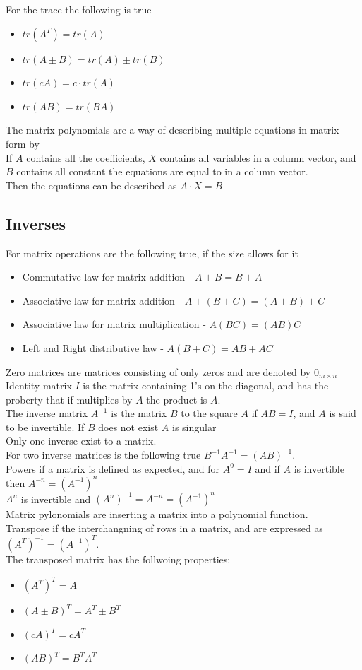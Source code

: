 \documentclass[12pt, a4paper]{article}
\begin{document}
				For the trace the following is true
				\begin{itemize}
					\item $tr(A^T)=tr(A)$
					\item $tr(A\pm B)=tr(A)\pm tr(B)$
					\item $tr(cA)=c\cdot tr(A)$
					\item $tr(AB)=tr(BA)$
				\end{itemize}
				The matrix polynomials are a way of describing multiple equations in matrix form by\\
				If $A$ contains all the coefficients, $X$ contains all variables in a column vector, and $B$ contains all constant the equations are equal to in a column vector.\\
				Then the equations can be described as  $A\cdot X=B$
		\subsection{Inverses}
			For matrix operations are the following true, if the size allows for it
			\begin{itemize}
				\item Commutative law for matrix addition - $A + B = B + A$
				\item Associative law for matrix addition - $A + ( B + C) = (A+B)+C$
				\item Associative law for matrix multiplication - $A(BC)=(AB)C$\\
				\item Left and Right distributive law - $A(B+C)=AB+AC$
			\end{itemize}
			Zero matrices are matrices consisting of only zeros and are denoted by $0_{m\times n}$\\
			Identity matrix $I$ is the matrix containing 1's on the diagonal, and has the proberty that if multiplies by $A$ the product is $A$.\\
			The inverse matrix $A^{-1}$ is the matrix $B$ to the square $A$ if $AB=I$, and $A$ is said to be invertible. If $B$ does not exist $A$ is singular\\
			Only one inverse exist to a matrix.\\
			For two inverse matrices is the following true $B^{-1}A^{-1}=(AB)^{-1}$.\\
			Powers if a matrix is defined as expected, and for $A^0=I$ and if $A$ is invertible then $A^{-n}=(A^{-1})^n$\\
			$A^n$ is invertible and $(A^n)^{-1}=A^{-n}=(A^{-1})^n$\\
			Matrix pylonomials are inserting a matrix into a polynomial function.\\
			Transpose if the interchangning of rows in a matrix, and are expressed as $(A^T)^{-1}=(A^{-1})^T$.\\
			The transposed matrix has the follwoing properties:
			\begin{itemize}
				\item $(A^T)^T=A$
				\item $(A\pm B)^T=A^T\pm B^T$ 
				\item $(cA)^T=cA^T$
				\item $(AB)^T=B^TA^T$
			\end{itemize}
\end{document}
